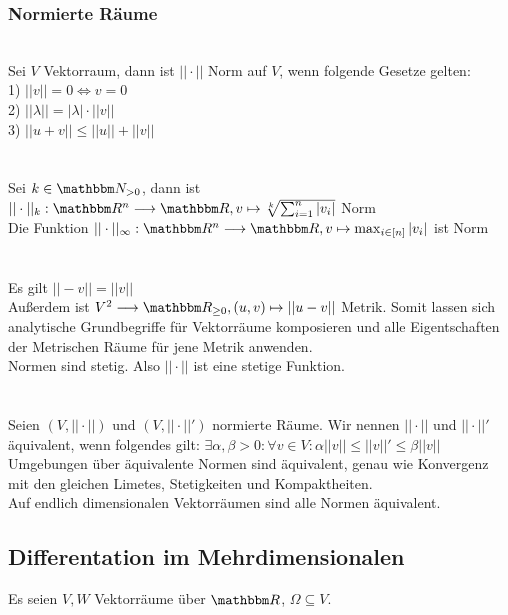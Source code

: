\subsubsection*{Normierte Räume}
 \\
Sei \(V\) Vektorraum, dann ist \(||\cdot||\) Norm auf \(V\), wenn folgende Gesetze gelten:\\
1) \(||v|| = 0 \Longleftrightarrow v = 0\) \\
2) \(||\lambda|| = |\lambda| \cdot ||v||\) \\
3) \(||u+v|| \le ||u|| + ||v||\) \\ \\
 \\
Sei \(k \in \N_{> 0}\), dann ist \(||\cdot||_k : \R^n \longrightarrow \R, v \mapsto \sqrt[k]{\sum_{i=1}^{n}|v_i|}\) Norm \\
Die Funktion \(||\cdot||_\infty : \R^n \longrightarrow \R, v \mapsto \max_{i \in [n]}|v_i|\) ist Norm \\ \\
 \\
Es gilt \(||-v|| = ||v||\) \\
Außerdem ist \(V^2 \longrightarrow \R_{\ge 0}, (u,v) \mapsto ||u-v||\) Metrik. Somit lassen sich analytische Grundbegriffe für Vektorräume komposieren und alle Eigentschaften der Metrischen Räume für jene Metrik anwenden. \\
Normen sind stetig. Also \(||\cdot||\) ist eine stetige Funktion. \\ \\
 \\
Seien \((V, ||\cdot||)\) und \((V, ||\cdot||')\) normierte Räume. Wir nennen \(||\cdot||\) und \(||\cdot||'\) äquivalent, wenn folgendes gilt: \(\exists \alpha,\beta > 0: \forall v \in V: \alpha ||v|| \le ||v||' \le \beta||v||\) \\
Umgebungen über äquivalente Normen sind äquivalent, genau wie Konvergenz mit den gleichen Limetes, Stetigkeiten und Kompaktheiten. \\
Auf endlich dimensionalen Vektorräumen sind alle Normen äquivalent.
\subsection*{Differentation im Mehrdimensionalen}
Es seien \(V, W\) Vektorräume über \(\R\), \(\Omega \subseteq V\).
